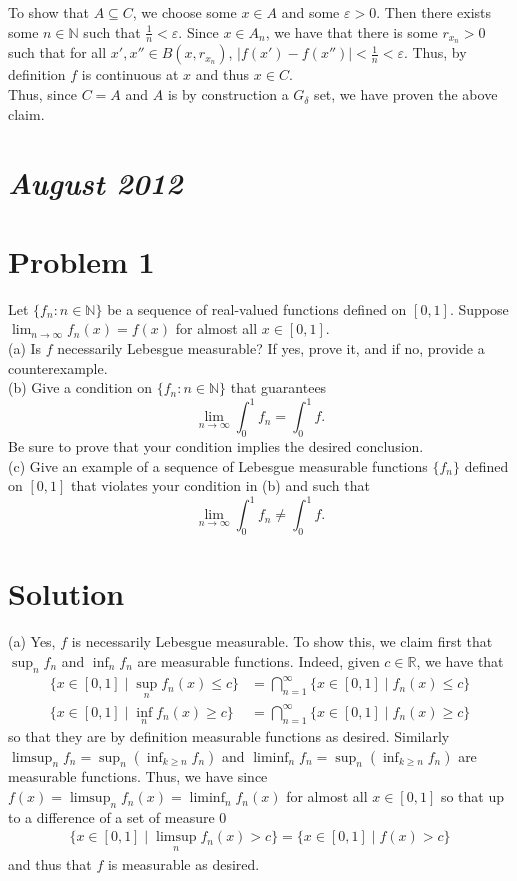 \documentclass{article}
\begin{document}
\noindent To show that $A\subseteq C$, we choose some $x\in A$ and some $\varepsilon>0$.  Then there exists some $n\in\mathbb{N}$ such that $\frac{1}{n}<\varepsilon$.  Since $x\in A_n$, we have that there is some $r_{x_n}>0$ such that for all $x',x''\in B(x,r_{x_n})$, $|f(x')-f(x'')|<\frac{1}{n}<\varepsilon$.  Thus, by definition $f$ is continuous at $x$ and thus $x\in C$.\\

\noindent Thus, since $C=A$ and $A$ is by construction a $G_\delta$ set, we have proven the above claim.



\section*{{\it August 2012}}

\section*{Problem 1}
Let $\{f_n:n\in\mathbb{N}\}$ be a sequence of real-valued functions defined on $[0,1]$.  Suppose $\lim_{n\rightarrow\infty}f_n(x)=f(x)$ for almost all $x\in[0,1]$.\\

\noindent (a) Is $f$ necessarily Lebesgue measurable? If yes, prove it, and if no, provide a counterexample.\\

\noindent (b) Give a condition on $\{f_n:n\in\mathbb{N}\}$ that guarantees $$\lim_{n\rightarrow\infty}\int_0^1f_n=\int_0^1f.$$  Be sure to prove that your condition implies the desired conclusion.\\

\noindent (c) Give an example of a sequence of Lebesgue measurable functions $\{f_n\}$ defined on $[0,1]$ that violates your condition in (b) and such that $$\lim_{n\rightarrow\infty}\int_0^1f_n\neq\int_0^1f.$$

\section*{Solution}
(a) Yes, $f$ is necessarily Lebesgue measurable.  To show this, we claim first that $\sup_nf_n$ and $\inf_nf_n$ are measurable functions.  Indeed, given $c\in\mathbb{R}$, we have that
\begin{align*}
\{x\in[0,1]\mid\sup_nf_n(x)\leq c\}&=\bigcap_{n=1}^\infty\{x\in[0,1]\mid f_n(x)\leq c\}\\
\{x\in[0,1]\mid\inf_nf_n(x)\geq c\}&=\bigcap_{n=1}^\infty\{x\in[0,1]\mid f_n(x)\geq c\}
\end{align*}
so that they are by definition measurable functions as desired.  Similarly $\limsup_nf_n=\sup_{n}(\inf_{k\geq n}f_n)$ and $\liminf_nf_n=\sup_n(\inf_{k\geq n}f_n)$ are measurable functions.  Thus, we have since $f(x)=\limsup_nf_n(x)=\liminf_nf_n(x)$ for almost all $x\in[0,1]$ so that up to a difference of a set of measure 0
\begin{align*}
\{x\in[0,1]\mid \limsup_nf_n(x)>c\}=\{x\in[0,1]\mid f(x)>c\}
\end{align*}
and thus that $f$ is measurable as desired.\\
\end{document}

